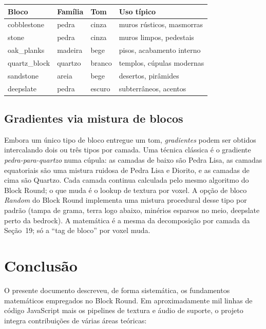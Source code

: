 \documentclass[12pt,a4paper]{scrartcl}
\begin{document}
\vspace{0.4em}
\begin{center}
\begin{tabular}{@{}llll@{}}
\toprule
\textbf{Bloco} & \textbf{Família} & \textbf{Tom} & \textbf{Uso típico} \\
\midrule
cobblestone        & pedra  & cinza  & muros rústicos, masmorras \\
stone              & pedra  & cinza  & muros limpos, pedestais \\
oak\_planks        & madeira   & bege   & pisos, acabamento interno \\
quartz\_block      & quartzo    & branco   & templos, cúpulas modernas \\
sandstone          & areia   & bege   & desertos, pirâmides \\
deepslate          & pedra  & escuro  & subterrâneos, acentos \\
\bottomrule
\end{tabular}
\end{center}

\subsection{Gradientes via mistura de blocos}
Embora um único tipo de bloco entregue um tom, \emph{gradientes} podem ser obtidos intercalando dois ou três tipos por camada. Uma técnica clássica é o gradiente \emph{pedra-para-quartzo} numa cúpula: as camadas de baixo são Pedra Lisa, as camadas equatoriais são uma mistura ruidosa de Pedra Lisa e Diorito, e as camadas de cima são Quartzo. Cada camada continua calculada pelo mesmo algoritmo do Block Round; o que muda é o lookup de textura por voxel. A opção de bloco \emph{Random} do Block Round implementa uma mistura procedural desse tipo por padrão (tampa de grama, terra logo abaixo, minérios esparsos no meio, deepslate perto da bedrock). A matemática é a mesma da decomposição por camada da Seção~19; só a \enquote{tag de bloco} por voxel muda.

\section{Conclusão}

O presente documento descreveu, de forma sistemática, os fundamentos matemáticos empregados no Block Round. Em aproximadamente mil linhas de código JavaScript mais os pipelines de textura e áudio de suporte, o projeto integra contribuições de várias áreas teóricas:
\end{document}
